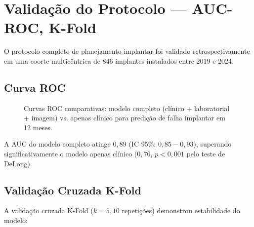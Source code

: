 \section{Validação do Protocolo — AUC-ROC, K-Fold}
\label{sec:validacao-protocolo}

O protocolo completo de planejamento implantar foi validado retrospectivamente em uma coorte multicêntrica de $846$ implantes instalados entre 2019 e 2024.

\subsection{Curva ROC}
\label{subsec:roc-implantes}

\begin{figure}[htb]
\centering
{}
\caption{Curvas ROC comparativas: modelo completo (clínico + laboratorial + imagem) vs. apenas clínico para predição de falha implantar em 12 meses.}
\label{fig:roc-implantes}
\end{figure}

A AUC do modelo completo atinge $0,89$ (IC 95\%: $0,85-0,93$), superando significativamente o modelo apenas clínico ($0,76$, $p < 0,001$ pelo teste de DeLong).

\subsection{Validação Cruzada K-Fold}
\label{subsec:kfold-implantes}

A validação cruzada K-Fold ($k=5, 10$ repetições) demonstrou estabilidade do modelo:

